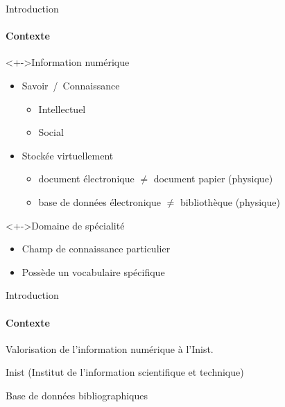 \begin{frame}{Introduction}\framesubtitle{Contexte}

  \begin{block}<+->{Information numérique}
    \begin{itemize}
      \item{Savoir~/~Connaissance}
      \begin{itemize}
        \item{Intellectuel}
        \item{Social}
      \end{itemize}
      \item{Stockée virtuellement}
      \begin{itemize}
        \item{document électronique $\neq$ document papier (physique)}
        \item{base de données électronique $\neq$ bibliothèque (physique)}
      \end{itemize}
    \end{itemize}
  \end{block}

  \begin{block}<+->{Domaine de spécialité}
    \begin{itemize}
      \item{Champ de connaissance particulier}
      \item{Possède un vocabulaire spécifique}
    \end{itemize}
  \end{block}
\end{frame}

\begin{frame}{Introduction}\framesubtitle{Contexte}
  Valorisation de l'information numérique à l'Inist.

  \begin{block}{Inist (Institut de l'information scientifique et technique)}
  \end{block}

  \begin{block}{Base de données bibliographiques}
  \end{block}
\end{frame}


